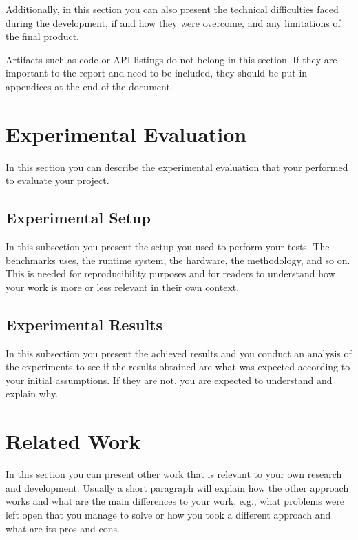\documentclass[sigconf,balance,nonacm,authordraft]{acmart}
\begin{document}
Additionally, in this section you can also present the technical difficulties faced during the development, if and how they were overcome, and any limitations of the final product.

Artifacts such as code or API listings do not belong in this section. If they are important to the report and need to be included, they should be put in appendices at the end of the document.

\section{Experimental Evaluation}
\label{sec:evaluation}
In this section you can describe the experimental evaluation that your performed to evaluate your project.

\subsection{Experimental Setup}
In this subsection you present the setup you used to perform your tests. The benchmarks uses, the runtime system, the hardware, the methodology, and so on. This is needed for reproducibility purposes and for readers to understand how your work is more or less relevant in their own context.

\subsection{Experimental Results}
In this subsection you present the achieved results and you conduct an analysis of the experiments to see if the results obtained are what was expected according to your initial assumptions. If they are not, you are expected to understand and explain why.

\section{Related Work}
\label{sec:rel}
In this section you can present other work that is relevant to your own research and development. Usually a short paragraph will explain how the other approach works and what are the main differences to your work, e.g., what problems were left open that you manage to solve or how you took a different approach and what are its pros and cons.
\end{document}
